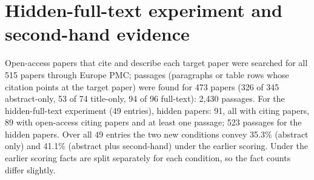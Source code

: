 \documentclass{article} %
\begin{document}
\FloatBarrier
\section{Hidden-full-text experiment and second-hand evidence}
\label{app:hidden}
Open-access papers that cite and describe each target paper were searched for all 515 papers through Europe PMC; passages (paragraphs or table rows whose citation points at the target paper) were found for 473 papers (326 of 345 abstract-only, 53 of 74 title-only, 94 of 96 full-text): 2,430 passages. For the hidden-full-text experiment (49 entries), hidden papers: 91, all with citing papers, 89 with open-access citing papers and at least one passage; 523 passages for the hidden papers. Over all 49 entries the two new conditions convey 35.3\% (abstract only) and 41.1\% (abstract plus second-hand) under the earlier scoring. Under the earlier scoring facts are split separately for each condition, so the fact counts differ slightly.
\end{document}
